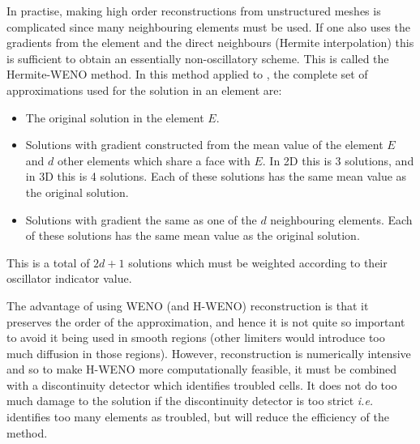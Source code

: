 In practise, making high order reconstructions from unstructured
meshes is complicated since many neighbouring elements must be
used. If one also uses the gradients from the element and the direct
neighbours (Hermite interpolation) this is sufficient to obtain an
essentially non-oscillatory scheme. This is called the Hermite-WENO
method. In this method applied to \Pone, the complete set of
approximations used for the solution in an element are:
\begin{itemize}
\item The original solution in the element $E$.
\item Solutions with gradient constructed from the mean value of the
  element $E$ and $d$ other elements which share a face with $E$.  In
  2D this is 3 solutions, and in 3D this is 4 solutions. Each of these
  solutions has the same mean value as the original solution.
\item Solutions with gradient the same as one of the $d$ neighbouring
  elements. Each of these solutions has the same mean value as the
  original solution.
\end{itemize}
This is a total of $2d+1$ solutions which must be weighted according
to their oscillator indicator value.

The advantage of using WENO (and H-WENO) reconstruction is that it
preserves the order of the approximation, and hence it is not quite so
important to avoid it being used in smooth regions (other limiters
would introduce too much diffusion in those regions). However,
reconstruction is numerically intensive and so to make H-WENO more
computationally feasible, it must be combined with a discontinuity
detector which identifies troubled cells. It does not do too much
damage to the solution if the discontinuity detector is too strict
\emph{i.e.}  identifies too many elements as troubled, but will reduce
the efficiency of the method.

